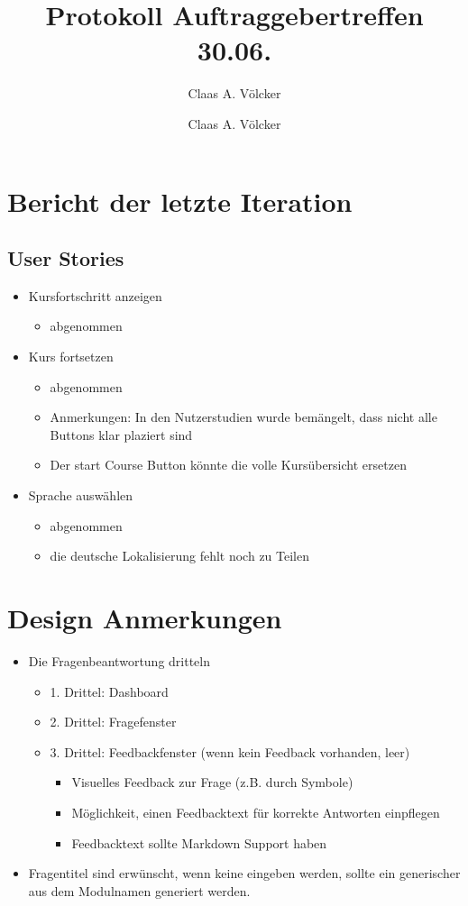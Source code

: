 \documentclass[colorback, accentcolor=tud1c, paper=a4]{tudexercise}
\title{Protokoll Auftraggebertreffen 30.06.}
\subtitle{Claas A. Völcker}
\author{Claas A. Völcker}
\begin{document}
	
\maketitle

\begin{multicols}{2}

\section{Bericht der letzte Iteration}

\subsection{User Stories}
\begin{itemize}
	\item Kursfortschritt anzeigen
	\begin{itemize}
		\item abgenommen
	\end{itemize}
	\item Kurs fortsetzen
	\begin{itemize}
		\item abgenommen
		\item Anmerkungen: In den Nutzerstudien wurde bemängelt, dass nicht alle Buttons klar plaziert sind
		\item Der start Course Button könnte die volle Kursübersicht ersetzen
	\end{itemize}
	\item Sprache auswählen
	\begin{itemize}
		\item abgenommen
		\item die deutsche Lokalisierung fehlt noch zu Teilen
	\end{itemize}
\end{itemize}

\section{Design Anmerkungen}
\begin{itemize}
	\item Die Fragenbeantwortung dritteln
	\begin{itemize}
		\item 1. Drittel: Dashboard
		\item 2. Drittel: Fragefenster
		\item 3. Drittel: Feedbackfenster (wenn kein Feedback vorhanden, leer)
		\begin{itemize}
			\item Visuelles Feedback zur Frage (z.B. durch Symbole)
			\item Möglichkeit, einen Feedbacktext für korrekte Antworten einpflegen
			\item Feedbacktext sollte Markdown Support haben
		\end{itemize}
	\end{itemize}
	\item Fragentitel sind erwünscht, wenn keine eingeben werden, sollte ein generischer aus dem Modulnamen generiert werden.
\end{itemize}



\end{multicols}
\end{document}
